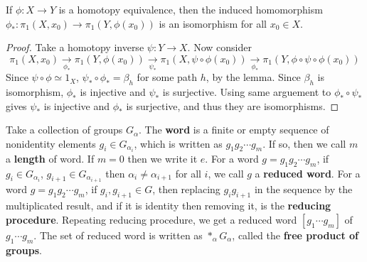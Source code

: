 \begin{prop} If $\phi:X\rightarrow Y$ is a homotopy equivalence, then the induced homomorphism $\phi_*:\pi_1(X,x_0)\rightarrow \pi_1(Y,\phi(x_0))$ is an isomorphism for all $x_0\in X$.
\end{prop}
\begin{proof}
Take a homotopy inverse $\psi:Y\rightarrow X$. Now consider
\begin{equation}
\pi_1(X,x_0)\xrightarrow[\phi_*]{}\pi_1(Y,\phi(x_0))\xrightarrow[\psi_*]{}\pi_1(X,\psi\circ\phi(x_0))\xrightarrow[\phi_*]{}\pi_1(Y,\phi\circ\psi\circ\phi(x_0))
\end{equation}
Since $\psi\circ\phi\simeq 1_X$, $\psi_*\circ \phi_*=\beta_h$ for some path $h$, by the lemma. Since $\beta_h$ is isomorphism, $\phi_*$ is injective and $\psi_*$ is surjective. Using same arguement to $\phi_*\circ \psi_*$ gives $\psi_*$ is injective and $\phi_*$ is surjective, and thus they are isomorphisms.
\end{proof}

\begin{defn} Take a collection of groups $G_{\alpha}$. The \textbf{word} is a finite or empty sequence of nonidentity elements $g_i\in G_{\alpha_i}$, which is written as $g_1g_2\cdots g_m$. If so, then we call $m$ a \textbf{length} of word. If $m=0$ then we write it $e$. For a word $g=g_1 g_2\cdots g_m$, if $g_{i}\in G_{\alpha_i}$, $g_{i+1}\in G_{\alpha_{i+1}}$ then $\alpha_{i}\neq \alpha_{i+1}$ for all $i$, we call $g$ a \textbf{reduced word}. For a word $g=g_1g_2\cdots g_m$, if $g_i,g_{i+1}\in G$, then replacing $g_ig_{i+1}$ in the sequence by the multiplicated result, and if it is identity then removing it, is the \textbf{reducing procedure}. Repeating reducing procedure, we get a reduced word $[g_1\cdots g_m]$ of $g_1\cdots g_m$.  The set of reduced word is written as $*_\alpha G_\alpha$, called the \textbf{free product of groups}.
\end{defn}


